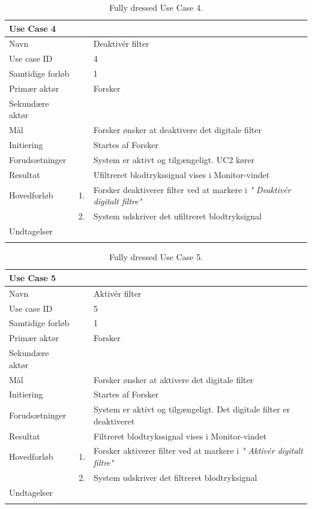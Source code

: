 \begin{longtabu} to  %
    {\large \textbf{Use Case 4}} && \\
    \toprule
    Navn &&    Deaktivér filter\\
    Use case ID &&    4\\
    Samtidige forløb &&   1\\
    Primær aktør &&    Forsker\\
    Sekundære aktør &&	 \\
    Mål &&    Forsker ønsker at deaktivere det digitale filter\\
    Initiering &&	Startes af Forsker\\
    Forudsætninger &&  System er aktivt og tilgængeligt. UC2 kører  \\
    Resultat &&		Ufiltreret blodtrykssignal vises i Monitor-vindet                 \\ \midrule
    Hovedforløb &    1. &    Forsker deaktiverer filter ved at markere i \textit{" Deaktivér digitalt filtre"} \\[-1ex]   						 	
                &    2. &    System udskriver det ufiltreret blodtryksignal\newline\\ \midrule
                
    Undtagelser &     &      \\ \bottomrule
\caption{Fully dressed Use Case 4.}
\label{UC4}
\end{longtabu}


\begin{longtabu} to  %
    {\large \textbf{Use Case 5}} && \\
    \toprule
    Navn &&    Aktivér filter\\
    Use case ID &&    5\\
    Samtidige forløb &&   1\\
    Primær aktør &&    Forsker\\
    Sekundære aktør &&	 \\
    Mål &&    Forsker ønsker at aktivere det digitale filter\\
    Initiering &&	Startes af Forsker\\
    Forudsætninger &&  System er aktivt og tilgængeligt. Det digitale filter er deaktiveret  \\
    Resultat &&		Filtreret blodtrykssignal vises i Monitor-vindet                 \\ \midrule
    Hovedforløb &    1. &    Forsker aktiverer filter ved at markere i \textit{" Aktivér digitalt filtre"} \\[-1ex]   						 	
                &    2. &    System udskriver det filtreret blodtryksignal\newline\\ \midrule
                
    Undtagelser &     &      \\ \bottomrule
\caption{Fully dressed Use Case 5.}
\label{UC5}
\end{longtabu}
    
